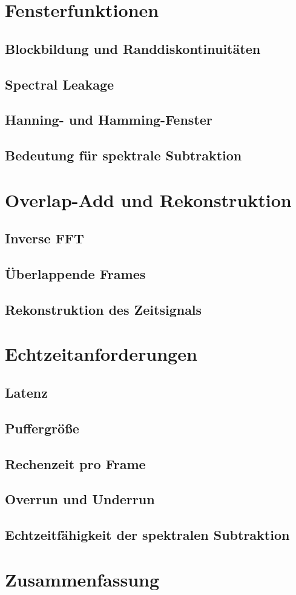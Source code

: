 \section{Fensterfunktionen}

\subsection{Blockbildung und Randdiskontinuitäten}

\subsection{Spectral Leakage}

\subsection{Hanning- und Hamming-Fenster}

\subsection{Bedeutung für spektrale Subtraktion}

\section{Overlap-Add und Rekonstruktion}
\subsection{Inverse FFT}
\subsection{Überlappende Frames}
\subsection{Rekonstruktion des Zeitsignals}
\section{Echtzeitanforderungen}
\subsection{Latenz}
\subsection{Puffergröße}
\subsection{Rechenzeit pro Frame}
\subsection{Overrun und Underrun}
\subsection{Echtzeitfähigkeit der spektralen Subtraktion}
\section{Zusammenfassung}
